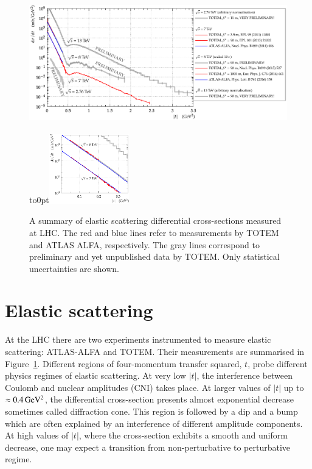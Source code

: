 \documentclass{webofc}
\def\un#1{\,{\rm #1}}
\begin{document}
\begin{figure}[h]
\centering
\includegraphics[height=6cm,clip]{fig/es_summary.pdf}
\vbox to0pt{\vss\includegraphics[height=3cm,clip]{fig/es_summary_detail_cone.pdf}\vskip3.3cm}
\vskip-7mm
\caption{A summary of elastic scattering differential cross-sections measured at LHC. The red and blue lines refer to measurements by TOTEM and ATLAS ALFA, respectively. The gray lines correspond to preliminary and yet unpublished data by TOTEM. Only statistical uncertainties are shown.}
\label{f:es summary}
\end{figure}

\section{Elastic scattering}
\label{s:es}

At the LHC there are two experiments instrumented to measure elastic scattering: ATLAS-ALFA and TOTEM. Their measurements are summarised in Figure~\ref{f:es summary}. Different regions of four-momentum transfer squared, $t$, probe different physics regimes of elastic scattering. At very low $|t|$, the interference between Coulomb and nuclear amplitudes (CNI) takes place. At larger values of $|t|$ up to $\approx 0.4\un{GeV^2}$, the differential cross-section presents almost exponential decrease sometimes called diffraction cone. This region is followed by a dip and a bump which are often explained by an interference of different amplitude components. At high values of $|t|$, where the cross-section exhibits a smooth and uniform decrease, one may expect a transition from non-perturbative to perturbative regime.
\end{document}

